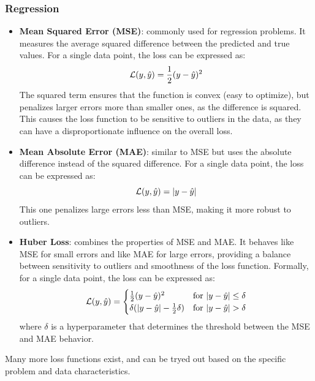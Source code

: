 \subsubsection{Regression}
\begin{itemize}
    \item \textbf{Mean Squared Error (MSE)}: commonly used for regression problems. 
    It measures the average squared difference between the predicted and true values.
    For a single data point, the loss can be expressed as:
    \begin{equation*}
        \mathcal{L}(y, \hat{y}) = \frac{1}{2}(y - \hat{y})^2
    \end{equation*}
    The squared term ensures that the function is convex (easy to optimize), but penalizes larger errors more than smaller ones, as the difference is squared.
    This causes the loss function to be sensitive to outliers in the data, as they can have a disproportionate influence on the overall loss.

    \item \textbf{Mean Absolute Error (MAE)}: similar to MSE but uses the absolute difference instead of the squared difference.
    For a single data point, the loss can be expressed as:
    \begin{equation*}
        \mathcal{L}(y, \hat{y}) = |y - \hat{y}|
    \end{equation*}
    This one penalizes large errors less than MSE, making it more robust to outliers.
    
    \item \textbf{Huber Loss}: combines the properties of MSE and MAE. It behaves like MSE for small errors and like MAE for large errors, providing a balance between sensitivity to outliers and smoothness of the loss function.
    Formally, for a single data point, the loss can be expressed as:
    \begin{equation*}
        \mathcal{L}(y, \hat{y}) = \begin{cases}
        \frac{1}{2}(y - \hat{y})^2 & \text{for } |y - \hat{y}| \leq \delta \\
        \delta (|y - \hat{y}| - \frac{1}{2}\delta) & \text{for } |y - \hat{y}| > \delta
        \end{cases}
    \end{equation*}
    where $\delta$ is a hyperparameter that determines the threshold between the MSE and MAE behavior.
\end{itemize}
Many more loss functions exist, and can be tryed out based on the specific problem and data characteristics.

